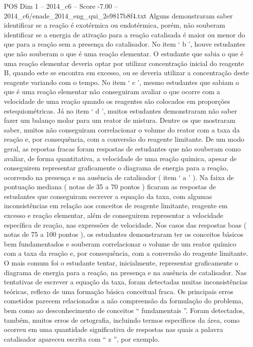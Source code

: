 \begin{textsample}{POS Dim 1 – 2014\_c6 – Score -7.00 – 2014\_c6/enade\_2014\_eng\_qui\_2e9817b8f4.txt}
Alguns demonstraram saber identificar se a reação é exotérmica ou endotérmica, porém, não souberam identificar se a energia de ativação para a reação catalisada é maior ou menor do que para a reação sem a presença do catalisador.
No item ‘ b ’, houve estudantes que não souberam o que é uma reação elementar.
O estudante que sabia o que é uma reação elementar deveria optar por utilizar concentração inicial do reagente B, quando este se encontra em excesso, ou se deveria utilizar a concentração deste reagente variando com o tempo.
No item ‘ c ’, mesmo estudantes que sabiam o que é uma reação elementar não conseguiram avaliar o que ocorre com a velocidade de uma reação quando os reagentes são colocados em proporções estequiométricas.
Já no item ‘ d ’, muitos estudantes demonstraram não saber fazer um balanço molar para um reator de mistura.
Dentre os que mostraram saber, muitos não conseguiram correlacionar o volume do reator com a taxa da reação e, por consequência, com a conversão do reagente limitante.
De um modo geral, as repostas fracas foram respostas de estudantes que não souberam como avaliar, de forma quantitativa, a velocidade de uma reação química, apesar de conseguirem representar graficamente o diagrama de energia para a reação, ocorrendo na presença e na ausência de catalisador ( item ‘ a ’ ).
Na faixa de pontuação mediana ( notas de 35 a 70 pontos ) ficaram as respostas de estudantes que conseguiram escrever a equação da taxa, com algumas inconsistências em relação aos conceitos de reagente limitante, reagente em excesso e reação elementar, além de conseguirem representar a velocidade específica de reação, nas expressões de velocidade.
Nos casos das respostas boas ( notas de 75 a 100 pontos ), os estudantes demonstraram ter os conceitos básicos bem fundamentados e souberam correlacionar o volume de um reator químico com a taxa da reação e, por consequência, com a conversão do reagente limitante.
O mais comum foi o estudante tentar, inicialmente, representar graficamente o diagrama de energia para a reação, na presença e na ausência de catalisador.
Nas tentativas de escrever a equação da taxa, foram detectadas muitas inconsistências teóricas, reflexo de uma formação básica conceitual fraca.
Os principais erros cometidos parecem relacionados a não compreensão da formulação do problema, bem como ao desconhecimento de conceitos “ fundamentais ”.
Foram detectados, também, muitos erros de ortografia, incluindo termos específicos da área, como ocorreu em uma quantidade significativa de respostas nas quais a palavra catalisador apareceu escrita com “ z ”, por exemplo.

\end{textsample}
